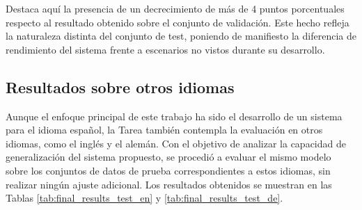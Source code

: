 
Destaca aquí la presencia de un decrecimiento de más de 4 puntos porcentuales respecto al resultado obtenido sobre el conjunto de validación. Este hecho refleja la naturaleza distinta del conjunto de test, poniendo de manifiesto la diferencia de rendimiento del sistema frente a escenarios no vistos durante su desarrollo.

\subsection{Resultados sobre otros idiomas}

\noindent Aunque el enfoque principal de este trabajo ha sido el desarrollo de un sistema para el idioma español, la \gls{Tarea} también contempla la evaluación en otros idiomas, como el inglés y el alemán. Con el objetivo de analizar la capacidad de generalización del sistema propuesto, se procedió a evaluar el mismo modelo sobre los conjuntos de datos de prueba correspondientes a estos idiomas, sin realizar ningún ajuste adicional. Los resultados obtenidos se muestran en las Tablas \ref{tab:final_results_test_en} y \ref{tab:final_results_test_de}.


